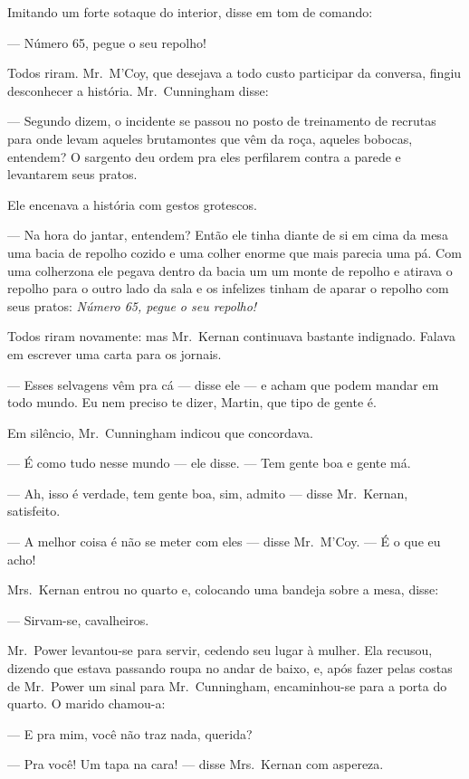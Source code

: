 Imitando um forte sotaque do interior, disse em tom de comando:

--- Número 65, pegue o seu repolho!

Todos riram.  Mr.~M’Coy, que desejava a todo custo participar da conversa,
fingiu desconhecer a história.  Mr.~Cunningham disse:

--- Segundo dizem, o incidente se passou no posto de treinamento de recrutas
para onde levam aqueles brutamontes que vêm da roça, aqueles bobocas, entendem?
O sargento deu ordem pra eles perfilarem contra a parede e levantarem seus
pratos.  

Ele encenava a história com gestos grotescos.

--- Na hora do jantar, entendem?  Então ele tinha diante de si em cima da mesa
uma bacia de repolho cozido e uma colher enorme que mais parecia uma pá.  Com
uma colherzona ele pegava dentro da bacia um um monte de repolho e atirava o
repolho para o outro lado da sala e os infelizes tinham de aparar o repolho com
seus pratos: \textit{Número 65, pegue o seu repolho!}

Todos riram novamente: mas Mr.~Kernan continuava bastante indignado.  Falava em
escrever uma carta para os jornais.

--- Esses selvagens vêm pra cá --- disse ele --- e acham que podem mandar em
todo mundo.  Eu nem preciso te dizer, Martin, que tipo de gente é.

Em silêncio, Mr.~Cunningham indicou que concordava.

--- É como tudo nesse mundo --- ele disse.  --- Tem gente boa e gente má.

--- Ah, isso é verdade, tem gente boa, sim, admito --- disse Mr.~Kernan,
satisfeito.

--- A melhor coisa é não se meter com eles --- disse Mr.~M’Coy. --- É o que eu
acho!

Mrs.~Kernan entrou no quarto e, colocando uma bandeja sobre a mesa, disse:

--- Sirvam-se, cavalheiros.

Mr.~Power levantou-se para servir, cedendo seu lugar à mulher.  Ela recusou,
dizendo que estava passando roupa no andar de baixo, e, após fazer pelas costas
de Mr.~Power um sinal para Mr.~Cunningham, encaminhou-se para a porta do
quarto.  O marido chamou-a:

--- E pra mim, você não traz nada, querida?

--- Pra você!  Um tapa na cara! --- disse Mrs.~Kernan com aspereza.

